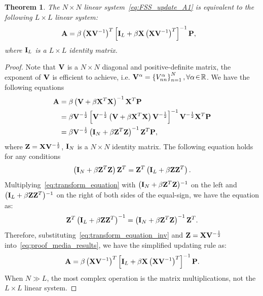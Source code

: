 \documentclass[a4paper]{article}
\newtheorem{theorem}{Theorem}  %
\begin{document}
\begin{theorem} \label{theorem:FSS_update_A1_A2}The $N\times N$
linear system\ \eqref{eq:FSS_update_A1} is equivalent to the following
$L\times L$ linear system: 
\begin{align}
\mathbf{A} & =\beta\left(\mathbf{X}\mathbf{V}^{-1}\right)^{T}\left[\mathbf{I}_{L}+\beta\mathbf{X}\left(\mathbf{X}\mathbf{V}^{-1}\right)^{T}\right]^{-1}\mathbf{P},\label{eq:FSS_update_A2}
\end{align}
 where $\mathbf{I}_{L}$ is a $L\times L$ identity matrix. \end{theorem}
\begin{proof} Note that $\mathbf{V}$ is a $N\times N$ diagonal and
positive-definite matrix, the exponent of $\mathbf{V}$ is efficient to
achieve, i.e. $\mathbf{V}^{\alpha}=\left\{ V_{nn}^{\alpha}\right\} _{n=1}^{N},\forall\alpha\!\in\!\mathbb{R}$.
We have the following equations
\begin{align}
\mathbf{A} & =\beta\left(\mathbf{V}+\beta\mathbf{X}^{T}\mathbf{X}\right)^{-1}\mathbf{X}^{T}\mathbf{P}\nonumber \\
 & =\beta\mathbf{V}^{-\frac{1}{2}}\left[\mathbf{V}^{-\frac{1}{2}}\left(\mathbf{V}+\beta\mathbf{X}^{T}\mathbf{X}\right)\mathbf{V}^{-\frac{1}{2}}\right]^{-1}\mathbf{V}^{-\frac{1}{2}}\mathbf{X}^{T}\mathbf{P}\nonumber \\
 & =\beta\mathbf{V}^{-\frac{1}{2}}\left(\mathbf{I}_{N}+\beta\mathbf{Z}^{T}\mathbf{Z}\right)^{-1}\mathbf{Z}^{T}\mathbf{P},\label{eq:proof_media_results}
\end{align}
where $\mathbf{Z}=\mathbf{X}\mathbf{V}^{-\frac{1}{2}}$, $\mathbf{I}_{N}$ is a $N\times N$
identity matrix. The following equation holds for any conditions 
\begin{equation}
\left(\mathbf{I}_{N}+\beta\mathbf{Z}^{T}\mathbf{Z}\right)\mathbf{Z}^{T}=\mathbf{Z}^{T}\left(\mathbf{I}_{L}+\beta\mathbf{Z}\mathbf{Z}^{T}\right).\label{eq:transform_equation}
\end{equation}
Multiplying\ \eqref{eq:transform_equation} with $\left(\mathbf{I}_{N}+\beta\mathbf{Z}^{T}\mathbf{Z}\right)\!{}^{-1}$
on the left and $\left(\mathbf{I}_{L}+\beta\mathbf{Z}\mathbf{Z}^{T}\right)\!{}^{-1}$
on the right of both sides of the equal-sign, we have the equation
as:
\begin{equation}
\mathbf{Z}^{T}\left(\mathbf{I}_{L}+\beta\mathbf{Z}\mathbf{Z}^{T}\right)^{-1}=\left(\mathbf{I}_{N}+\beta\mathbf{Z}^{T}\mathbf{Z}\right)^{-1}\mathbf{Z}^{T}.\label{eq:transform_equation_inv}
\end{equation}
Therefore, substituting\ \eqref{eq:transform_equation_inv} and $\mathbf{Z}=\mathbf{X}\mathbf{V}^{-\frac{1}{2}}$
into\ \eqref{eq:proof_media_results}, we have the simplified updating
rule as: 
\begin{equation}
\mathbf{A}=\beta\left(\mathbf{X}\mathbf{V}^{-1}\right)^{T}\left[\mathbf{I}_{L}+\beta\mathbf{X}\left(\mathbf{X}\mathbf{V}^{-1}\right)^{T}\right]^{-1}\mathbf{P}.
\end{equation}
When $N\gg L$, the most complex operation is the matrix multiplications,
not the $L\times L$ linear system.\end{proof} 
\end{document}
